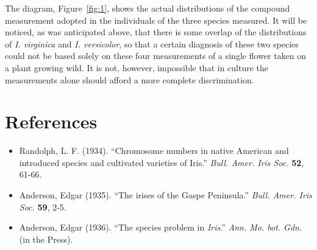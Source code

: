 \documentclass[12pt]{article}
\begin{document}
The diagram, Figure~\ref{fig:1}, shows the actual distributions of the compound measurement adopted in the individuals of the three species measured. It will be noticed, as was anticipated above, that there is some overlap of the distributions of \textit{I. virginica} and \textit{I. versicolor}, so that a certain diagnosis of these two species could not be based solely on these four measurements of a single flower taken on a plant growing wild. It is not, however, impossible that in culture the measurements alone should afford a more complete discrimination.

\section*{References}
\begin{itemize}
\item Randolph, L. F. (1934). ``Chromosome numbers in native American and introduced species and cultivated varieties of Iris.'' \textit{Bull. Amer. Iris Soc.} \textbf{52}, 61-66.
\item Anderson, Edgar (1935). ``The irises of the Gaspe Peninsula.'' \textit{Bull. Amer. Iris Soc.} \textbf{59}, 2-5.
\item Anderson, Edgar (1936). ``The species problem in \textit{Iris}.'' \textit{Ann. Mo. bot. Gdn.} (in the Press).
\end{itemize}
\end{document}
